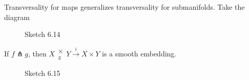 \begin{remark}
    Transversality for maps generalizes transversality for submanifolds. Take the diagram 
    \begin{figure}[H]\label{fig:6.14}
        \centering
        \caption{Sketch 6.14}
    \end{figure}
\end{remark}

\begin{proposition}\label{prop:6.2}
    If \(f\pitchfork g\), then \(X\substack{\times\\z} Y \stackrel{i}{\to} X\times Y\) is a smooth embedding.
\end{proposition}
\begin{figure}[H]\label{fig:6.15}
    \centering
    \caption{Sketch 6.15}
\end{figure}

